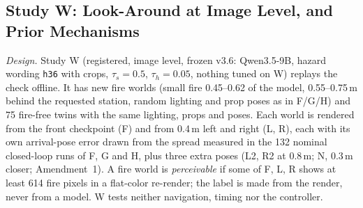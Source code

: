 \documentclass[conference]{IEEEtran}
\newcommand{\taus}{\tau_{s}}
\newcommand{\tauh}{\tau_{h}}
\begin{document}
\subsection{Study W: Look-Around at Image Level, and Prior Mechanisms}\label{sec:moved-w}
\emph{Design.} Study W (registered, image level, frozen v3.6: Qwen3.5-9B, hazard wording \texttt{h36} with crops, $\taus=0.5$, $\tauh=0.05$, nothing tuned on W) replays the check offline. It has \WNPerc{} new fire worlds (small fire 0.45--0.62 of the model, 0.55--0.75\,m behind the requested station, random lighting and prop poses as in F/G/H) and 75 fire-free twins with the same lighting, props and poses. Each world is rendered from the front checkpoint (F) and from 0.4\,m left and right (L, R), each with its own arrival-pose error drawn from the spread measured in the 132 nominal closed-loop runs of F, G and H, plus three extra poses (L2, R2 at 0.8\,m; N, 0.3\,m closer; Amendment~1). A fire world is \emph{perceivable} if some of F, L, R shows at least 614 fire pixels in a flat-color re-render; the label is made from the render, never from a model. W tests neither navigation, timing nor the controller.
\end{document}
